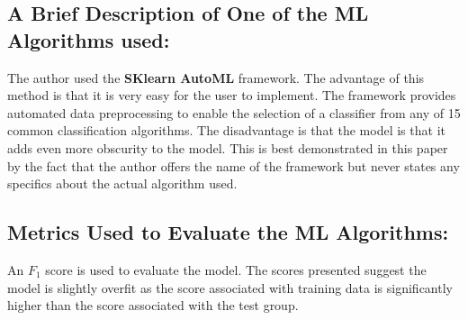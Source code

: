 \documentclass[]{article}
\begin{document}
\subsection*{A Brief Description of One of the ML Algorithms used:}
The author used the \textbf{SKlearn AutoML} framework. 
The advantage of this method is that it is very easy for the user to implement.
The framework provides automated data preprocessing to enable the selection of a classifier from any of 15 common classification algorithms.
The disadvantage is that the model is that it adds even more obscurity to the model.
This is best demonstrated in this paper by the fact that the author offers the name of the framework but never states any specifics about the actual algorithm used.

\subsection*{Metrics Used to Evaluate the ML Algorithms:}
An $F_1$ score is used to evaluate the model. 
The scores presented suggest the model is slightly overfit as the score associated with training data is significantly higher than the score associated with the test group.
\end{document}
